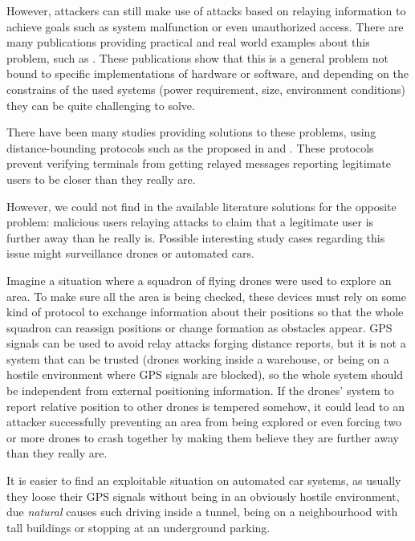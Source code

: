 \documentclass{article}
\begin{document}
However, attackers can still make use of attacks based on relaying information to achieve goals such as system malfunction or even unauthorized access. There are many publications providing practical and real world examples about this problem, such as \cite{francillon2011relay, hancke2005practical, hu2006wormhole}. These publications show that this is a general problem not bound to specific implementations of hardware or software, and depending on the constrains of the used systems (power requirement, size, environment conditions) they can be quite challenging to solve.

There have been many studies providing solutions to these problems, using distance-bounding protocols such as the proposed in \cite{brands1994distance} and \cite{rasmussen2010realization}. These protocols prevent verifying terminals from getting relayed messages reporting legitimate users to be closer than they really are.

However, we could not find in the available literature solutions for the opposite problem: malicious users relaying attacks to claim that a legitimate user is further away than he really is. Possible interesting study cases regarding this issue might surveillance drones or automated cars.

Imagine a situation where a squadron of flying drones were used to explore an area. To make sure all the area is being checked, these devices must rely on some kind of protocol to exchange information about their positions so that the whole squadron can reassign positions or change formation as obstacles appear. GPS signals can be used to avoid relay attacks forging distance reports, but it is not a system that can be trusted (drones working inside a warehouse, or being on a hostile environment where GPS signals are blocked), so the whole system should be independent from external positioning information. If the drones' system to report relative position to other drones is tempered somehow, it could lead to an attacker successfully preventing an area from being explored or even forcing two or more drones to crash together by making them believe they are further away than they really are.

It is easier to find an exploitable situation on automated car systems, as usually they loose their GPS signals without being in an obviously hostile environment, due \emph{natural} causes such driving inside a tunnel, being on a neighbourhood with tall buildings or stopping at an underground parking.
\end{document}
